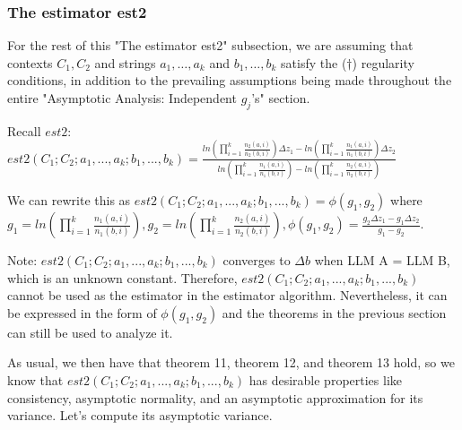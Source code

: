 \documentclass{article}
\begin{document}
\subsubsection{The estimator est2}
\begin{mdframed}
For the rest of this "The estimator est2" subsection, we are assuming that contexts $C_1, C_2$ and strings $a_1, \dots, a_k$ and $b_1, \dots, b_k$ satisfy the ($\dagger$) regularity conditions, in addition to the prevailing assumptions being made throughout the entire "Asymptotic Analysis: Independent $g_j$'s" section.
\end{mdframed}
Recall $\displaystyle est2$: $\displaystyle est2\left( C_{1} ;C_{2} ;a_{1} ,...,a_{k} ;b_{1} ,...,b_{k}\right) =\frac{ln\left(\prod _{i=1}^{k}\frac{n_{2}\left( a,i\right)}{n_{2}\left( b,i\right)}\right) \Delta z_{1} -ln\left(\prod _{i=1}^{k}\frac{n_{1}\left( a,i\right)}{n_{1}\left( b,i\right)}\right) \Delta z_{2}}{ln\left(\prod _{i=1}^{k}\frac{n_{1}\left( a,i\right)}{n_{1}\left( b,i\right)}\right) -ln\left(\prod _{i=1}^{k}\frac{n_{2}\left( a,i\right)}{n_{2}\left( b,i\right)}\right)}$



We can rewrite this as $\displaystyle est2\left( C_{1} ;C_{2} ;a_{1} ,...,a_{k} ;b_{1} ,...,b_{k}\right) =\phi \left( g_{1} ,g_{2}\right)$ where $\displaystyle g_{1} =ln\left(\prod _{i=1}^{k}\frac{n_{1}\left( a,i\right)}{n_{1}\left( b,i\right)}\right) ,g_{2} =ln\left(\prod _{i=1}^{k}\frac{n_{2}\left( a,i\right)}{n_{2}\left( b,i\right)}\right) ,\phi \left( g_{1} ,g_{2}\right) =\frac{g_{2} \Delta z_{1} -g_{1} \Delta z_{2}}{g_{1} -g_{2}}$.



Note: $\displaystyle est2\left( C_{1} ;C_{2} ;a_{1} ,...,a_{k} ;b_{1} ,...,b_{k}\right)$ converges to $\displaystyle \Delta b$ when LLM A = LLM B, which is an unknown constant. Therefore, $\displaystyle est2\left( C_{1} ;C_{2} ;a_{1} ,...,a_{k} ;b_{1} ,...,b_{k}\right)$ cannot be used as the estimator in the estimator algorithm. Nevertheless, it can be expressed in the form of $\displaystyle \phi \left( g_{1} ,g_{2}\right)$ and the theorems in the previous section can still be used to analyze it.



As usual, we then have that theorem 11, theorem 12, and theorem 13 hold, so we know that $\displaystyle est2\left( C_{1} ;C_{2} ;a_{1} ,...,a_{k} ;b_{1} ,...,b_{k}\right)$ has desirable properties like consistency, asymptotic normality, and an asymptotic approximation for its variance. Let's compute its asymptotic variance.
\end{document}
